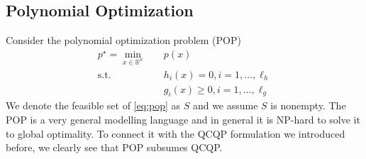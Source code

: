 \documentclass[
]{book}
\theoremstyle{definition}
\theoremstyle{definition}
\theoremstyle{definition}
\theoremstyle{definition}
\theoremstyle{remark}
\begin{document}
\subsection{Polynomial Optimization}\label{SOS:POP}

Consider the polynomial optimization problem (POP)
\begin{equation}
\begin{split}
p^\star = \min_{x \in \mathbb{R}^{n}} & \quad p(x) \\
\mathrm{s.t.}& \quad h_i(x) = 0, i=1,\dots,\ell_h \\
& \quad g_i(x) \geq 0, i=1,\dots,\ell_g
\end{split}
\label{eq:pop}
\end{equation}
We denote the feasible set of \eqref{eq:pop} as \(S\) and we assume \(S\) is nonempty. The POP is a very general modelling language and in general it is NP-hard to solve it to global optimality. To connect it with the QCQP formulation we introduced before, we clearly see that POP subsumes QCQP.
\end{document}

